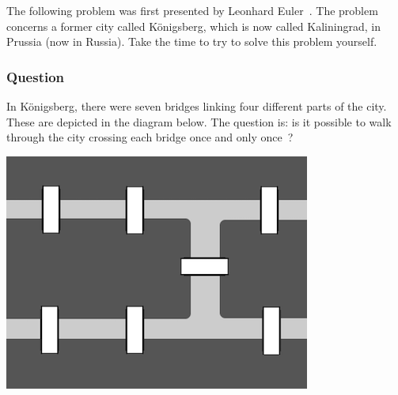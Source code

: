 \documentclass[addpoints,12pt]{exam}
\begin{document}
\noindent
The following problem was first presented by Leonhard Euler~\cite{euleroriginal}.
The problem concerns a former city called Königsberg, which is now called Kaliningrad, in Prussia (now in Russia).
Take the time to try to solve this problem yourself.

\subsubsection*{Question}
In Königsberg, there were seven bridges linking four different parts of the city.
These are depicted in the diagram below.
The question is: is it possible to walk through the city crossing each bridge once and only once~\cite{konigsbergwikipedia}?

\begin{center}
\includegraphics{diagram}
\end{center}




\end{document}
